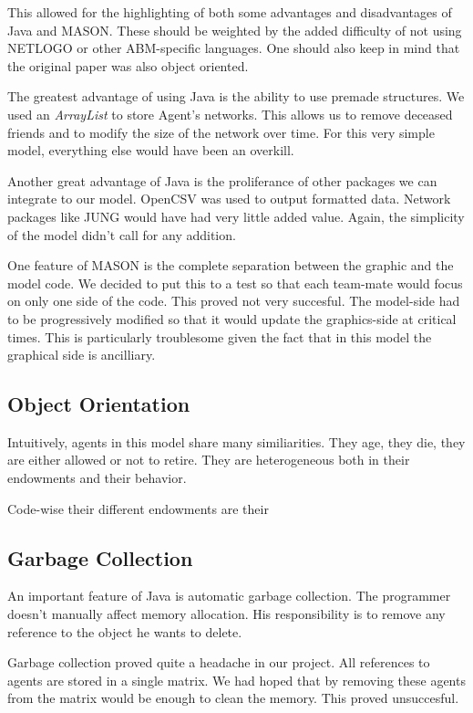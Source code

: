 \documentclass[runningheads,a4paper]{llncs}
\begin{document}
This allowed for the highlighting of both some advantages and disadvantages of Java and MASON.
These should be weighted by the added difficulty of not using NETLOGO or other ABM-specific languages.
One should also keep in mind that the original paper was also object oriented.

The greatest advantage of using Java is the ability to use premade structures.
We used an \textit{ArrayList} to store Agent's networks.
This allows us to remove deceased friends and to modify the size of the network over time.
For this very simple model, everything else would have been an overkill.

Another great advantage of Java is the proliferance of other packages we can integrate to our model.
OpenCSV was used to output formatted data.
Network packages like JUNG would have had very little added value.
Again, the simplicity of the model didn't call for any addition.

One feature of MASON is the complete separation between the graphic and the model code.
We decided to put this to a test so that each team-mate would focus on only one side of the code.
This proved not very succesful.
The model-side had to be progressively modified so that it would update the graphics-side at critical times.
This is particularly troublesome given the fact that in this model the graphical side is ancilliary.

\subsection{Object Orientation}

Intuitively, agents in this model share many similiarities.
They age, they die, they are either allowed or not to retire.
They are heterogeneous both in their endowments and their behavior.

Code-wise their different endowments are their 


\subsection{Garbage Collection}

An important feature of Java is automatic garbage collection.
The programmer doesn't manually affect memory allocation. 
His responsibility is to remove any reference to the object he wants to delete.

Garbage collection proved quite a headache in our project.
All references to agents are stored in a single matrix.
We had hoped that by removing these agents from the matrix would be enough to clean the memory.
This proved unsuccesful.
\end{document}
